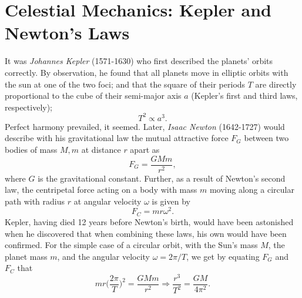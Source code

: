 \documentclass[]{article}
\begin{document}
\section{Celestial Mechanics: Kepler and Newton's Laws} \label{celestial-mechanics}
It was \textit{Johannes Kepler} (1571-1630) who first described the planets' orbits correctly. By observation, he found that all planets move in elliptic orbits with the sun at one of the two foci; and that the square of their periods $T$ are directly proportional to the cube of their semi-major axis $a$ \cite{hibbeler2001} (Kepler's first and third laws, respectively);
\begin{equation}
	T^2 \propto a^3.
\end{equation}
Perfect harmony prevailed, it seemed. Later, \textit{Isaac Newton} (1642-1727) would describe with his gravitational law the mutual attractive force $F_G$ between two bodies of mass $M, m$ at distance $r$ apart as
\begin{equation} \label{newton-grav}
	F_G = \frac{GMm}{r^2},
\end{equation}
where $G$ is the gravitational constant. Further, as a result of Newton's second law, the centripetal force acting on a body with mass $m$ moving along a circular path with radius $r$ at angular velocity $\omega$ is given by
\begin{equation}
	F_C = mr\omega^2.
\end{equation}
Kepler, having died 12 years before Newton's birth, would have been astonished when he discovered that when combining these laws, his own would have been confirmed. For the simple case of a circular orbit, with the Sun's mass $M$, the planet mass $m$, and the angular velocity $\omega = 2\pi/T$, we get by equating $F_G$ and $F_C$ that
\begin{equation} \label{r3-T2}
	mr\bigg(\frac{2\pi}{T}\bigg)^2 = \frac{GMm}{r^2} \Rightarrow \frac{r^3}{T^2} = \frac{GM}{4\pi^2}.
\end{equation}
\end{document}
